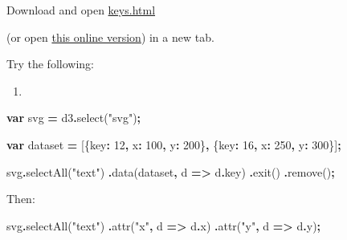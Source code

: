 \documentclass[
  openany]{book}
\newenvironment{Shaded}{\begin{snugshade}}{\end{snugshade}}
\newcommand{\AttributeTok}[1]{\textcolor[rgb]{0.77,0.63,0.00}{#1}}
\newcommand{\DataTypeTok}[1]{\textcolor[rgb]{0.13,0.29,0.53}{#1}}
\newcommand{\DecValTok}[1]{\textcolor[rgb]{0.00,0.00,0.81}{#1}}
\newcommand{\FunctionTok}[1]{\textcolor[rgb]{0.00,0.00,0.00}{#1}}
\newcommand{\KeywordTok}[1]{\textcolor[rgb]{0.13,0.29,0.53}{\textbf{#1}}}
\newcommand{\NormalTok}[1]{#1}
\newcommand{\OperatorTok}[1]{\textcolor[rgb]{0.81,0.36,0.00}{\textbf{#1}}}
\newcommand{\StringTok}[1]{\textcolor[rgb]{0.31,0.60,0.02}{#1}}
\providecommand{\tightlist}{%
  \setlength{\itemsep}{0pt}\setlength{\parskip}{0pt}}
\begin{document}
Download and open \href{code/keys.html}{keys.html}

(or open \href{https://jtr13.github.io/D3/DataBindwithKeys.html}{this online version}) in a new tab.

Try the following:

\begin{enumerate}
\def\labelenumi{\arabic{enumi}.}
\tightlist
\item
\end{enumerate}

\begin{Shaded}
\begin{Highlighting}[]
\KeywordTok{var}\NormalTok{ svg }\OperatorTok{=}\NormalTok{ d3}\OperatorTok{.}\FunctionTok{select}\NormalTok{(}\StringTok{"svg"}\NormalTok{)}\OperatorTok{;}

\KeywordTok{var}\NormalTok{ dataset }\OperatorTok{=}\NormalTok{ [\{}\DataTypeTok{key}\OperatorTok{:} \DecValTok{12}\OperatorTok{,} \DataTypeTok{x}\OperatorTok{:} \DecValTok{100}\OperatorTok{,} \DataTypeTok{y}\OperatorTok{:} \DecValTok{200}\NormalTok{\}}\OperatorTok{,}
\NormalTok{              \{}\DataTypeTok{key}\OperatorTok{:} \DecValTok{16}\OperatorTok{,} \DataTypeTok{x}\OperatorTok{:} \DecValTok{250}\OperatorTok{,} \DataTypeTok{y}\OperatorTok{:} \DecValTok{300}\NormalTok{\}]}\OperatorTok{;}
              
\NormalTok{svg}\OperatorTok{.}\FunctionTok{selectAll}\NormalTok{(}\StringTok{"text"}\NormalTok{)}
  \OperatorTok{.}\FunctionTok{data}\NormalTok{(dataset}\OperatorTok{,}\NormalTok{ d }\KeywordTok{=\textgreater{}}\NormalTok{ d}\OperatorTok{.}\AttributeTok{key}\NormalTok{)}
  \OperatorTok{.}\FunctionTok{exit}\NormalTok{()}
  \OperatorTok{.}\FunctionTok{remove}\NormalTok{()}\OperatorTok{;}
\end{Highlighting}
\end{Shaded}

Then:

\begin{Shaded}
\begin{Highlighting}[]
\NormalTok{svg}\OperatorTok{.}\FunctionTok{selectAll}\NormalTok{(}\StringTok{"text"}\NormalTok{)}
  \OperatorTok{.}\FunctionTok{attr}\NormalTok{(}\StringTok{"x"}\OperatorTok{,}\NormalTok{ d }\KeywordTok{=\textgreater{}}\NormalTok{ d}\OperatorTok{.}\AttributeTok{x}\NormalTok{)}
  \OperatorTok{.}\FunctionTok{attr}\NormalTok{(}\StringTok{"y"}\OperatorTok{,}\NormalTok{ d }\KeywordTok{=\textgreater{}}\NormalTok{ d}\OperatorTok{.}\AttributeTok{y}\NormalTok{)}\OperatorTok{;}
\end{Highlighting}
\end{Shaded}
\end{document}
